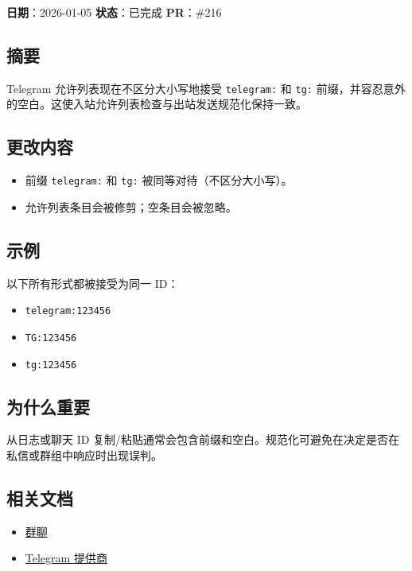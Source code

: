 \textbf{日期}：2026-01-05
\textbf{状态}：已完成
\textbf{PR}：\#216

\subsection{摘要}


Telegram 允许列表现在不区分大小写地接受 \texttt{telegram:} 和 \texttt{tg:} 前缀，并容忍意外的空白。这使入站允许列表检查与出站发送规范化保持一致。

\subsection{更改内容}


\begin{itemize}
  \item 前缀 \texttt{telegram:} 和 \texttt{tg:} 被同等对待（不区分大小写）。
  \item 允许列表条目会被修剪；空条目会被忽略。
\end{itemize}


\subsection{示例}


以下所有形式都被接受为同一 ID：

\begin{itemize}
  \item \texttt{telegram:123456}
  \item \texttt{TG:123456}
  \item \texttt{tg:123456}
\end{itemize}


\subsection{为什么重要}


从日志或聊天 ID 复制/粘贴通常会包含前缀和空白。规范化可避免在决定是否在私信或群组中响应时出现误判。

\subsection{相关文档}


\begin{itemize}
  \item \href{/channels/groups}{群聊}
  \item \href{/channels/telegram}{Telegram 提供商}
\end{itemize}



